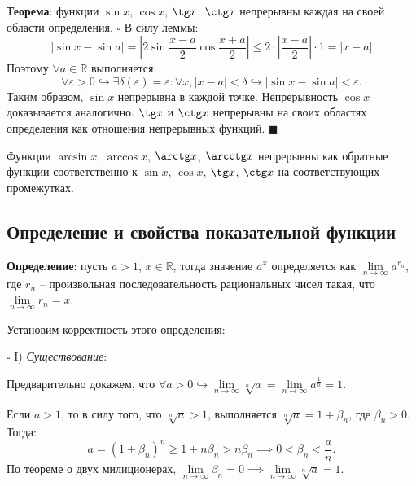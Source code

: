 \documentclass[12pt, a4paper, reqno]{article}
\begin{document}
    \textbf{Теорема}: функции $\sin{x}$, $\cos{x}$, $\tg x$, $\ctg x$ непрерывны каждая на своей
    области определения.
    $\square$ В силу леммы:
    \begin{equation*}
        |\sin{x} - \sin{a}| = \left|2\sin{\dfrac{x - a}{2}}\cos{\dfrac{x + a}{2}}\right| \leq
        2\cdot\left|\dfrac{x - a}{2}\right|\cdot 1 = |x - a|
    \end{equation*}
    Поэтому $\forall a\in\mathbb{R}$ выполняется:
    \begin{equation*}
        \forall\varepsilon > 0\hookrightarrow\exists\delta(\varepsilon) = \varepsilon: \forall x,
        |x - a| < \delta\hookrightarrow |\sin{x} - \sin{a}| < \varepsilon.
    \end{equation*}
    Таким образом, $\sin{x}$ непрерывна в каждой точке. Непрерывность $\cos{x}$ доказывается
    аналогично. $\tg x$ и $\ctg x$ непрерывны на своих областях определения как отношения
    непрерывных функций. $\blacksquare$

    Функции $\arcsin{x}$, $\arccos{x}$, $\arctg x$, $\arcctg x$ непрерывны как обратные функции
    соответственно к $\sin{x}$, $\cos{x}$, $\tg x$, $\ctg x$ на соответствующих промежутках.

\subsection{Определение и свойства показательной функции}

    \textbf{Определение}: пусть $a > 1$, $x\in\mathbb{R}$, тогда значение $a^x$ определяется как
    $\lim\limits_{n\to\infty} a^{r_n}$, где $r_n$ -- произвольная последовательность рациональных
    чисел такая, что $\lim\limits_{n\to\infty} r_n = x$.

    Установим корректность этого определения:

    $\square$ I) \textit{Существование}:

    Предварительно докажем, что $\forall a > 0\hookrightarrow \lim\limits_{n\to\infty} \sqrt[n]{a} =
    \lim\limits_{n\to\infty} a^{\frac{1}{n}} = 1$.

    Если $a > 1$, то в силу того, что $\sqrt[n]{a} > 1$, выполняется $\sqrt[n]{a} = 1 + \beta_n$,
    где $\beta_n > 0$. Тогда:
    \begin{equation*}
        a = (1 + \beta_n)^n \geq 1 + n\beta_n > n\beta_n \implies 0 < \beta_n < \dfrac{a}{n}.
    \end{equation*}
    По теореме о двух милиционерах, $\lim\limits_{n\to\infty} \beta_n = 0 \implies
    \lim\limits_{n\to\infty} \sqrt[n]{a} = 1$.
\end{document}
